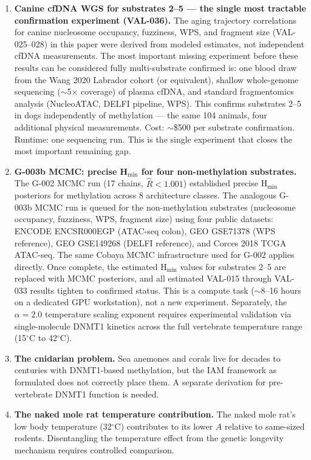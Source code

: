 \documentclass[11pt,a4paper]{article}
\newcommand{\Ascore}{A}
\begin{document}
\begin{enumerate}
\item \textbf{Canine cfDNA WGS for substrates 2--5 — the single most tractable confirmation experiment (VAL-036).}
The aging trajectory correlations for canine nucleosome occupancy, fuzziness,
WPS, and fragment size (VAL-025--028) in this paper were derived from modeled
estimates, not independent cfDNA measurements. The most important missing
experiment before these results can be considered fully multi-substrate confirmed
is: one blood draw from the Wang 2020 Labrador cohort (or equivalent), shallow
whole-genome sequencing ($\sim$5$\times$ coverage) of plasma cfDNA, and
standard fragmentomics analysis (NucleoATAC, DELFI pipeline, WPS).
This confirms substrates 2--5 in dogs independently of methylation ---
the same 104 animals, four additional physical measurements.
Cost: $\sim$\$500 per substrate confirmation. Runtime: one sequencing run.
This is the single experiment that closes the most important remaining gap.

\item \textbf{G-003b MCMC: precise H$_{\min}$ for four non-methylation substrates.}
The G-002 MCMC run (17 chains, $\hat{R} < 1.001$) established precise
H$_{\min}$ posteriors for methylation across 8 architecture classes.
The analogous G-003b MCMC run is queued for the non-methylation substrates
(nucleosome occupancy, fuzziness, WPS, fragment size) using four public datasets:
ENCODE ENCSR000EGP (ATAC-seq colon), GEO GSE71378 (WPS reference),
GEO GSE149268 (DELFI reference), and Corces 2018 TCGA ATAC-seq.
The same Cobaya MCMC infrastructure used for G-002 applies directly.
Once complete, the estimated H$_{\min}$ values for substrates 2--5
are replaced with MCMC posteriors, and all estimated VAL-015 through
VAL-033 results tighten to confirmed status. This is a compute task
($\sim$8--16 hours on a dedicated GPU workstation), not a new experiment.
Separately, the $\alpha = 2.0$ temperature scaling exponent requires
experimental validation via single-molecule DNMT1 kinetics across the
full vertebrate temperature range (15$^\circ$C to 42$^\circ$C).

\item \textbf{The cnidarian problem.} Sea anemones and corals live for decades
to centuries with DNMT1-based methylation, but the IAM framework as formulated
does not correctly place them. A separate derivation for pre-vertebrate DNMT1
function is needed.

\item \textbf{The naked mole rat temperature contribution.} The naked mole rat's
low body temperature (32$^\circ$C) contributes to its lower $\Ascore$ relative
to same-sized rodents. Disentangling the temperature effect from the
genetic longevity mechanism requires controlled comparison.


\end{enumerate}
\end{document}
